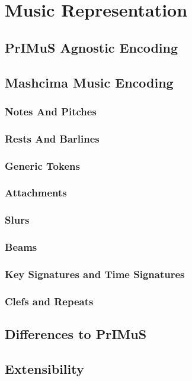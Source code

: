 \chapter{Music Representation}
\label{chap:MusicRepresentation}

\section{PrIMuS Agnostic Encoding}

\section{Mashcima Music Encoding}

\subsection{Notes And Pitches}

\subsection{Rests And Barlines}

\subsection{Generic Tokens}

\subsection{Attachments}

\subsection{Slurs}

\subsection{Beams}

\subsection{Key Signatures and Time Signatures}

\subsection{Clefs and Repeats}

\section{Differences to PrIMuS}

\section{Extensibility}

